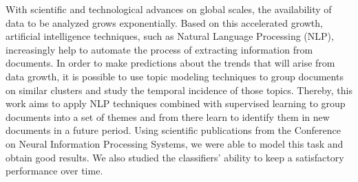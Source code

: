 With scientific and technological advances on global scales, the availability of data to be analyzed grows exponentially. Based on this accelerated growth, artificial intelligence techniques, such as Natural Language Processing (NLP), increasingly help to automate the process of extracting information from documents. In order to make predictions about the trends that will arise from data growth, it is possible to use topic modeling techniques to group documents on similar clusters and study the temporal incidence of those topics.
Thereby, this work aims to apply NLP techniques combined with supervised learning to group documents into a set of themes and from there learn to identify them in new documents in a future period. Using scientific publications from the Conference on Neural Information Processing Systems, we were able to model this task and obtain good results. We also studied the classifiers' ability to keep a satisfactory performance over time.

